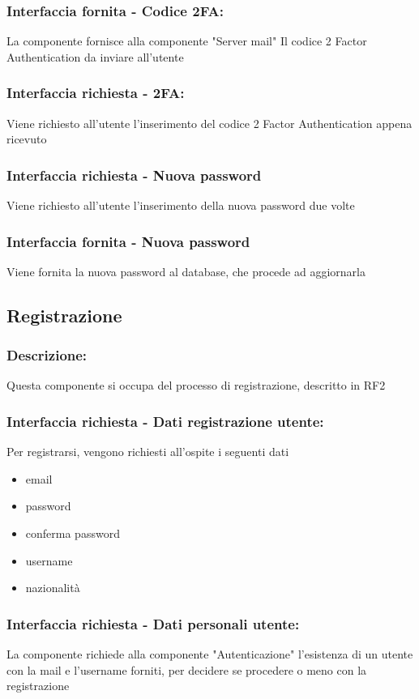 \documentclass{report}
\begin{document}
\subsubsection{Interfaccia fornita - Codice 2FA: } La componente fornisce alla componente "Server mail" Il codice 2 Factor Authentication da inviare all'utente
\subsubsection{Interfaccia richiesta - 2FA: } Viene richiesto all'utente l'inserimento del codice 2 Factor Authentication appena ricevuto
\subsubsection{Interfaccia richiesta - Nuova password} Viene richiesto all'utente l'inserimento della nuova password due volte
\subsubsection{Interfaccia fornita - Nuova password} Viene fornita la nuova password al database, che procede ad aggiornarla

\subsection*{Registrazione}
\subsubsection{Descrizione: } Questa componente si occupa del processo di registrazione, descritto in RF2
\subsubsection{Interfaccia richiesta - Dati registrazione utente: }Per registrarsi, vengono richiesti all'ospite i seguenti dati
\begin{itemize}
	\item email
	\item password
	\item conferma password
	\item username
	\item nazionalità
\end{itemize}
\subsubsection{Interfaccia richiesta - Dati personali utente: }La componente richiede alla componente "Autenticazione" l'esistenza di un utente con la mail e l'username forniti,
per decidere se procedere o meno con la registrazione
\end{document}
